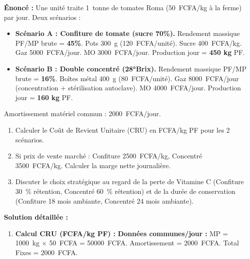 \documentclass[11pt]{article}
\begin{document}
\begin{exoresolu}
    \textbf{Énoncé :} Une unité traite \SI{1}{tonne} de tomates Roma (\SI{50}{FCFA/kg} à la ferme) par jour. Deux scénarios :
    \begin{itemize}
        \item \textbf{Scénario A : Confiture de tomate (sucre 70\%).} Rendement massique PF/MP brute = \textbf{45\%}. Pots \SI{300}{g} (\SI{120}{FCFA/unité}). Sucre \SI{400}{FCFA/kg}. Gaz \SI{5000}{FCFA/jour}. MO \SI{3000}{FCFA/jour}. Production jour = \textbf{450 kg} PF.
        \item \textbf{Scénario B : Double concentré (28°Brix).} Rendement massique PF/MP brute = \textbf{16\%}. Boîtes métal \SI{400}{g} (\SI{80}{FCFA/unité}). Gaz \SI{8000}{FCFA/jour} (concentration + stérilisation autoclave). MO \SI{4000}{FCFA/jour}. Production jour = \textbf{160 kg} PF.
    \end{itemize}
    Amortissement matériel commun : \SI{2000}{FCFA/jour}.
    \begin{enumerate}
        \item Calculer le Coût de Revient Unitaire (CRU) en FCFA/kg PF pour les 2 scénarios.
        \item Si prix de vente marché : Confiture \SI{2500}{FCFA/kg}, Concentré \SI{3500}{FCFA/kg}. Calculer la marge nette journalière.
        \item Discuter le choix stratégique au regard de la perte de Vitamine C (Confiture \SI{30}{\%} rétention, Concentré \SI{60}{\%} rétention) et de la durée de conservation (Confiture 18 mois ambiante, Concentré 24 mois ambiante).
    \end{enumerate}
    \tcblower
    \textbf{Solution détaillée :}
    \begin{enumerate}
        \item \textbf{Calcul CRU (FCFA/kg PF) :}
            \textbf{Données communes/jour :} MP = \SI{1000}{kg} $\times$ \SI{50}{FCFA} = \SI{50000}{FCFA}. Amortissement = \SI{2000}{FCFA}. Total Fixes = \SI{2000}{FCFA}.
            

\end{enumerate}
\end{exoresolu}
\end{document}
